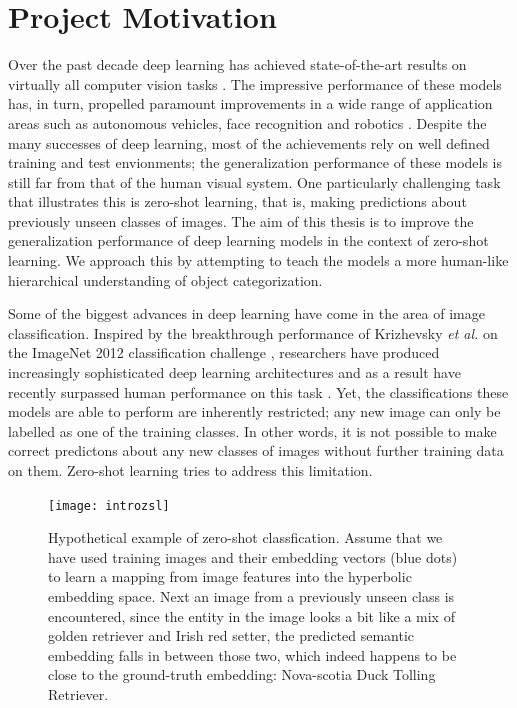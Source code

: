 \documentclass[12pt]{report}
\begin{document}
\section{Project Motivation}
Over the past decade deep learning has achieved state-of-the-art results on virtually all computer vision tasks \cite{Goodfellow2016}. The impressive performance of these models has, in turn, propelled paramount improvements in a wide range of application areas such as autonomous vehicles\cite{Bojarski2016}, face recognition \cite{Taigman2014} and robotics \cite{Finn2015}\cite{Ganegedara2017}. Despite the many successes of deep learning, most of the achievements rely on well defined training and test envionments; the generalization performance of these models is still far from that of the human visual system. One particularly challenging task that illustrates this is zero-shot learning, that is, making predictions about previously unseen classes of images. The aim of this thesis is to improve the generalization performance of deep learning models in the context of zero-shot learning. We approach this by attempting to teach the models a more human-like hierarchical understanding of object categorization.

Some of the biggest advances in deep learning have come in the area of image classification. Inspired by the breakthrough performance of Krizhevsky \textit{et al.} \cite{Krizhevsky2012} on the ImageNet 2012 classification challenge \cite{JiaDeng2009}, researchers have produced increasingly sophisticated deep learning architectures and as a result have recently surpassed human performance on this task \cite{Dodge2017}. Yet, the classifications these models are able to perform are inherently restricted; any new image can only be labelled as one of the training classes. In other words, it is not possible to make correct predictons about any new classes of images without further training data on them. Zero-shot learning \cite{Palatucci2009} tries to address this limitation.

\begin{figure}
  \centering
	\texttt{[image: introzsl]}
	\caption{Hypothetical example of zero-shot classfication. Assume that we have used training images and their embedding vectors (blue dots) to learn a mapping from image features into the hyperbolic embedding space. Next an image from a previously unseen class is encountered, since the entity in the image looks a bit like a mix of golden retriever and Irish red setter, the predicted semantic embedding falls in between those two, which indeed happens to be close to the ground-truth embedding: Nova-scotia Duck Tolling Retriever.}
	\label{fig:intro}
\end{figure}
\end{document}
